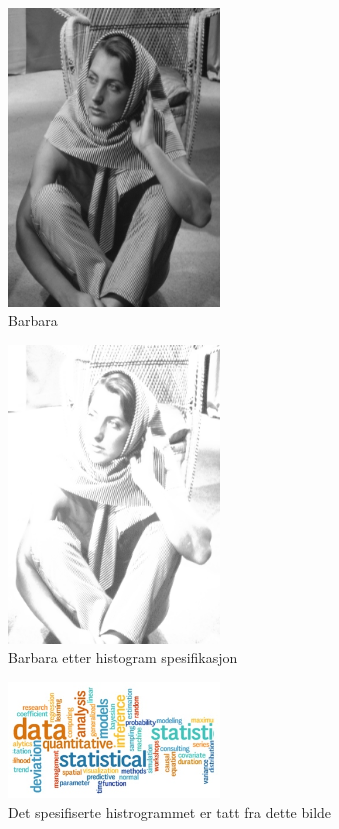\documentclass[a4paper, 12pt]{article}
\begin{document}
\begin{figure}[h]
  \centering
  \includegraphics[width=0.5\textwidth]{images/barbara}
  \caption{Barbara}
  \label{fig:barbara}
\end{figure}

\begin{figure}[h]
  \centering
  \includegraphics[width=0.5\textwidth]{images/barbara-histogram}
  \caption{Barbara etter histogram spesifikasjon}
  \label{fig:barbara-histogram}
\end{figure}

\begin{figure}[h]
  \centering
  \includegraphics[width=0.5\textwidth]{images/specified-histogram}
  \caption{Det spesifiserte histrogrammet er tatt fra dette bilde}
  \label{fig:specified-histogram}
\end{figure}
\end{document}
